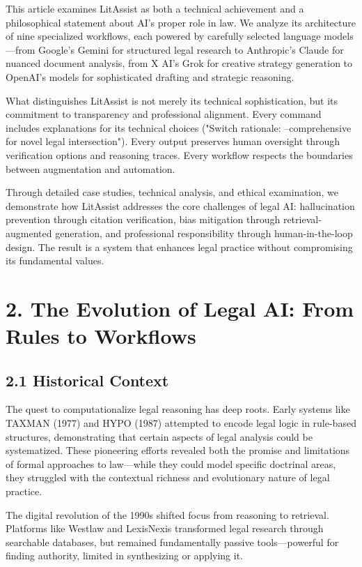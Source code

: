 \documentclass[12pt,a4paper]{article}
\begin{document}
This article examines LitAssist as both a technical achievement and a philosophical statement about AI's proper role in law. We analyze its architecture of nine specialized workflows, each powered by carefully selected language models—from Google's Gemini for structured legal research to Anthropic's Claude for nuanced document analysis, from X AI's Grok for creative strategy generation to OpenAI's models for sophisticated drafting and strategic reasoning.

What distinguishes LitAssist is not merely its technical sophistication, but its commitment to transparency and professional alignment. Every command includes explanations for its technical choices ("Switch rationale: --comprehensive for novel legal intersection"). Every output preserves human oversight through verification options and reasoning traces. Every workflow respects the boundaries between augmentation and automation.

Through detailed case studies, technical analysis, and ethical examination, we demonstrate how LitAssist addresses the core challenges of legal AI: hallucination prevention through citation verification, bias mitigation through retrieval-augmented generation, and professional responsibility through human-in-the-loop design. The result is a system that enhances legal practice without compromising its fundamental values.

\section*{2. The Evolution of Legal AI: From Rules to Workflows}

\subsection*{2.1 Historical Context}

The quest to computationalize legal reasoning has deep roots. Early systems like TAXMAN (1977) and HYPO (1987) attempted to encode legal logic in rule-based structures, demonstrating that certain aspects of legal analysis could be systematized. These pioneering efforts revealed both the promise and limitations of formal approaches to law—while they could model specific doctrinal areas, they struggled with the contextual richness and evolutionary nature of legal practice.

The digital revolution of the 1990s shifted focus from reasoning to retrieval. Platforms like Westlaw and LexisNexis transformed legal research through searchable databases, but remained fundamentally passive tools—powerful for finding authority, limited in synthesizing or applying it.
\end{document}
